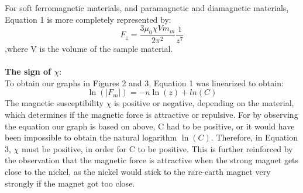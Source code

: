 \documentclass[letterpaper]{article}
\begin{document}
For soft ferromagnetic materials, and paramagnetic and diamagnetic materials, Equation 1 is more
completely represented by:
\begin{equation}
 F_z=\frac{3\mu_0\chi Vm_m}{2\pi^2}\frac{1}{z^7}
\end{equation}
,where V is the volume of the sample material.
\\ \\ \textbf{The sign of $\chi$}:\\
To obtain our graphs in Figures 2 and 3, Equation 1 was linearized to obtain:
$$\ln(|F_m|)=-n\ln(z)+ln(C)$$
The magnetic susceptibility $\chi$ is positive or negative, depending on the
material,
which determines if the magnetic force is attractive or repulsive.
For by observing the equation our graph is based on above, C had to be positive, or it would have been impossible to
obtain the natural logarithm $\ln(C)$.
Therefore, in Equation 3, $\chi$ must be positive, in order for C to be positive.
This is further reinforced by the observation that the magnetic force is attractive when the
strong magnet gets close to the nickel, as the nickel would stick to the rare-earth magnet very strongly if the magnet got too close.%
\end{document}
